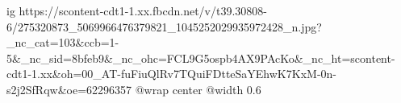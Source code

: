  
 
 
 
 

\ifcmt
  ig https://scontent-cdt1-1.xx.fbcdn.net/v/t39.30808-6/275320873_5069966476379821_1045252029935972428_n.jpg?_nc_cat=103&ccb=1-5&_nc_sid=8bfeb9&_nc_ohc=FCL9G5ospb4AX9PAcKo&_nc_ht=scontent-cdt1-1.xx&oh=00_AT-fuFiuQlRv7TQuiFDtteSaYEhwK7KxM-0n-s2j2SfRqw&oe=62296357
  @wrap center
  @width 0.6
\fi
